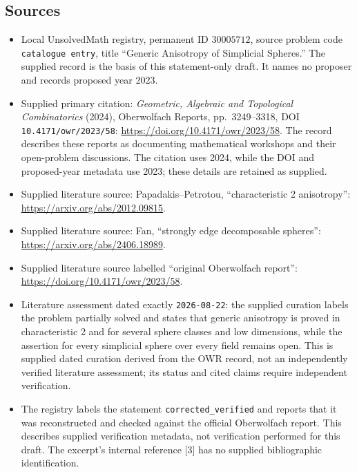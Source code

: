 \documentclass[11pt]{article}
\begin{document}
\subsection{Sources}
\begin{itemize}
\item Local UnsolvedMath registry, permanent ID \(30005712\), source problem code \texttt{catalogue entry}, title ``Generic Anisotropy of Simplicial Spheres.'' The supplied record is the basis of this statement-only draft. It names no proposer and records proposed year 2023.
\item Supplied primary citation: \emph{Geometric, Algebraic and Topological Combinatorics} (2024), Oberwolfach Reports, pp.\ 3249--3318, DOI \texttt{10.4171/owr/2023/58}: \url{https://doi.org/10.4171/owr/2023/58}. The record describes these reports as documenting mathematical workshops and their open-problem discussions. The citation uses 2024, while the DOI and proposed-year metadata use 2023; these details are retained as supplied.
\item Supplied literature source: Papadakis--Petrotou, ``characteristic 2 anisotropy'': \url{https://arxiv.org/abs/2012.09815}.
\item Supplied literature source: Fan, ``strongly edge decomposable spheres'': \url{https://arxiv.org/abs/2406.18989}.
\item Supplied literature source labelled ``original Oberwolfach report'': \url{https://doi.org/10.4171/owr/2023/58}.
\item Literature assessment dated exactly \texttt{2026-08-22}: the supplied curation labels the problem partially solved and states that generic anisotropy is proved in characteristic 2 and for several sphere classes and low dimensions, while the assertion for every simplicial sphere over every field remains open. This is supplied dated curation derived from the OWR record, not an independently verified literature assessment; its status and cited claims require independent verification.
\item The registry labels the statement \texttt{corrected\_verified} and reports that it was reconstructed and checked against the official Oberwolfach report. This describes supplied verification metadata, not verification performed for this draft. The excerpt's internal reference [3] has no supplied bibliographic identification.
\end{itemize}
\end{document}

